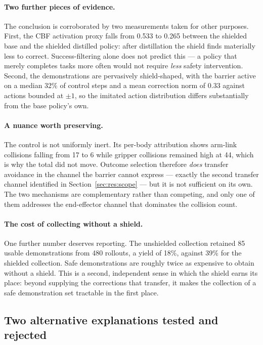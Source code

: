\paragraph{Two further pieces of evidence.}
The conclusion is corroborated by two measurements taken for other purposes. First, the CBF
activation proxy falls from 0.533 to 0.265 between the shielded base and the shielded distilled
policy: after distillation the shield finds materially less to correct. Success-filtering alone
does not predict this --- a policy that merely completes tasks more often would not require
\emph{less} safety intervention. Second, the demonstrations are pervasively shield-shaped, with the
barrier active on a median 32\% of control steps and a mean correction norm of 0.33 against actions
bounded at $\pm 1$, so the imitated action distribution differs substantially from the base
policy's own.

\paragraph{A nuance worth preserving.}
The control is not uniformly inert. Its per-body attribution shows arm-link collisions falling from
17 to 6 while gripper collisions remained high at 44, which is why the total did not move. Outcome
selection therefore \emph{does} transfer avoidance in the channel the barrier cannot express ---
exactly the second transfer channel identified in Section~\ref{sec:res:scope} --- but it is not
sufficient on its own. The two mechanisms are complementary rather than competing, and only one of
them addresses the end-effector channel that dominates the collision count.

\paragraph{The cost of collecting without a shield.}
One further number deserves reporting. The unshielded collection retained 85 usable demonstrations
from 480 rollouts, a yield of 18\%, against 39\% for the shielded collection. Safe demonstrations
are roughly twice as expensive to obtain without a shield. This is a second, independent sense in
which the shield earns its place: beyond supplying the corrections that transfer, it makes the
collection of a safe demonstration set tractable in the first place.

\subsection*{Two alternative explanations tested and rejected}


